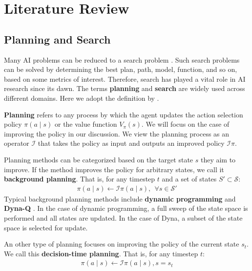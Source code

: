 \section{Literature Review} \label{sec:literature}

\subsection{Planning and Search}
Many AI problems can be reduced to a search problem \cite[p.39]{ArtificialIntelligenceGames_Yannakakis.Togelius_2018}.
Such search problems can be solved by determining the best plan, path, model, function, and so on, based on some metrics of interest.
Therefore, search has played a vital role in AI research since its dawn. The terms \textbf{planning} and \textbf{search} are widely used across different domains.
Here we adopt the definition by \citeauthor{ReinforcementLearningIntroduction_Sutton.Barto_2018} \cite{ReinforcementLearningIntroduction_Sutton.Barto_2018}.

\textbf{Planning} refers to any process by which the agent updates the action selection policy $\pi(a \mid s)$ or the value function $V_\pi(s)$.
We will focus on the case of improving the policy in our discussion.
We view the planning process as an operator $\mathcal{I}$ that takes the policy as input and outputs an improved policy $\mathcal{I}\pi$.

Planning methods can be categorized based on the target state $s$ they aim to improve.
If the method improves the policy for arbitrary states, we call it \textbf{background planning}.
That is, for any timestep $t$ and a set of states $S' \subset \mathcal{S}$:
\begin{align*}
    \pi(a \mid s) \leftarrow \mathcal{I}\pi(a \mid s), ~~ \forall s \in \mathcal{S'}
\end{align*}
Typical background planning methods include \textbf{dynamic programming} and \textbf{Dyna-Q} \cite{ReinforcementLearningIntroduction_Sutton.Barto_2018}.
In the case of dynamic programming, a full sweep of the state space is performed and all states are updated.
In the case of Dyna, a subset of the state space is selected for update.

An other type of planning focuses on improving the policy of the current state $s_t$.
We call this \textbf{decision-time planning}.
That is, for any timestep $t$:
\begin{align*}
    \pi(a \mid s) \leftarrow \mathcal{I}\pi(a \mid s), s = s_t
\end{align*}

